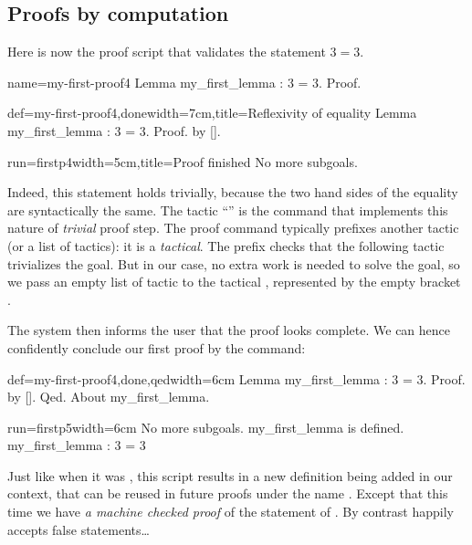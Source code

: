\subsection{Proofs by computation}\label{ssec:proofcomp}

Here is now the proof script that validates the statement $3 = 3$.

\begin{coqdef}{name=my-first-proof4}
Lemma my_first_lemma : 3 = 3.
Proof.
\end{coqdef}
\begin{coq}{def=my-first-proof4,done}{width=7cm,title=Reflexivity of equality}
Lemma my_first_lemma : 3 = 3.
Proof. by [].
\end{coq}
\begin{coqout}{run=firstp4}{width=5cm,title=Proof finished}
No more subgoals.
$~$
\end{coqout}

Indeed, this statement holds trivially, because the two hand sides of
the equality are syntactically the same. The tactic ``'' is
the command that
implements this nature of \emph{trivial} proof step. The proof command
 typically prefixes another tactic (or a list of tactics): it is
a \emph{tactical}. The  prefix checks that the following tactic
trivializes the goal. But in our case, no extra work is needed to
solve the goal, so we pass an empty list of tactic to the tactical
, represented by the empty bracket \C{[]}.


The system then informs the user that the proof looks complete. We can hence
confidently conclude our first proof by the  command:

\begin{coq}{def=my-first-proof4,done,qed}{width=6cm}
Lemma my_first_lemma : 3 = 3.
Proof. by []. Qed.
About my_first_lemma.
\end{coq}
\begin{coqout}{run=firstp5}{width=6cm}
No more subgoals.
my_first_lemma is defined.
my_first_lemma : 3 = 3
\end{coqout}

Just like when it was , this script results in a new definition
being
added in our context, that can be reused in future proofs under
the name .
Except that this time we have \emph{a machine checked proof} of
the statement of .  By contrast
 happily accepts false statements\dots
{}

